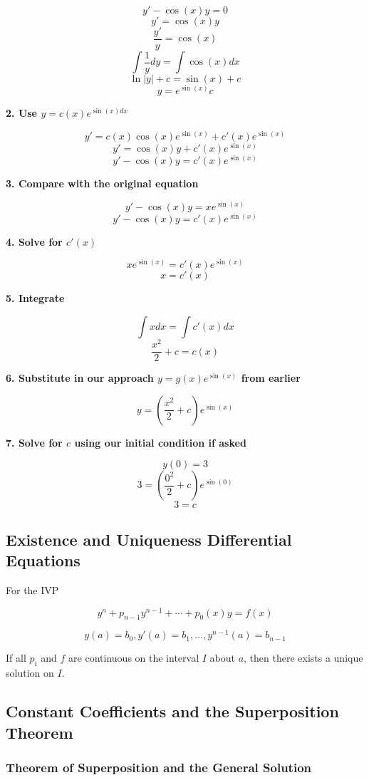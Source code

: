 \[y' -\cos(x)y = 0\]
\[y' = \cos(x)y\]
\[\frac{y'}{y} = \cos(x)\]
\[\int\frac{1}{y}dy = \int \cos(x)dx \]
\[ \ln |y|  + c= \sin(x) + c \]
\[ y = e^{\sin(x)}c \]

\textbf{2. Use \(y = c(x)e^{\sin(x)dx}\)}

\[y' = c(x)\cos(x)e^{\sin(x)} + c'(x)e^{\sin(x)}\]
\[y' = \cos(x)y + c'(x)e^{\sin(x)}\]
\[y' - \cos(x)y = c'(x)e^{\sin(x)}\]

\textbf{3. Compare with the original equation}

\[y' -\cos(x)y = x e^{\sin(x)}\]
\[y' - \cos(x)y = c'(x)e^{\sin(x)}\]

\textbf{4. Solve for \(c'(x)\)}

\[xe^{\sin(x)} = c'(x)e^{\sin(x)}\]
\[x = c'(x)\]

\textbf{5. Integrate}

\[\int x dx= \int c'(x)dx\]
\[\frac{x^2}{2} + c = c(x)\]

\textbf{6. Substitute in our approach \(y = g(x)e^{\sin(x)}\) from earlier}

\[y = \left(\frac{x^2}{2} + c\right)e^{\sin(x)}\]

\textbf{7. Solve for \(c\) using our initial condition if asked}

\[y(0) = 3\]
\[3 = \left(\frac{0^2}{2} + c\right)e^{\sin(0)}\]
\[3 = c\]


\subsection{Existence and Uniqueness Differential Equations}

For the IVP

\[y^{n} + p_{n - 1}y^{n - 1}+ \cdots + p_0 (x)y = f(x)\]

\[y(a) = b_0, y'(a) = b_1, \dots, y^{n - 1}(a) = b_{n - 1} \]

If all \(p_i\) and \(f\) are continuous on the interval \(I\) about \(a\), then
there exists a unique solution on \(I\).

\subsection{Constant Coefficients and the Superposition Theorem}

\subsubsection{Theorem of Superposition and the General Solution}

